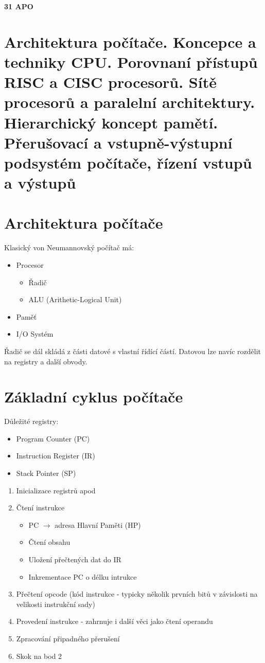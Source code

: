 \documentclass[10pt,a4paper,openright]{article}
\begin{document}
\begin{center}
\begin{LARGE}
\textbf{31 APO}\\
\end{LARGE}
\end{center}

\section*{Architektura počítače. Koncepce a techniky CPU. Porovnaní přístupů RISC a CISC procesorů. Sítě procesorů a paralelní architektury. Hierarchický koncept pamětí. Přerušovací a vstupně-výstupní podsystém počítače, řízení vstupů a výstupů}
\section{Architektura počítače}
Klasický von Neumannovský počítač má:
\begin{itemize}
\item Procesor
	\begin{itemize}
	\item Řadič
	\item ALU (Arithetic-Logical Unit)
	\end{itemize}
\item Paměť
\item I/O Systém
\end{itemize}
Řadič se dál skládá z části datové s vlastní řídící částí. Datovou lze navíc rozdělit na registry a další obvody.

\section{Základní cyklus počítače}

Důležité registry:
\begin{itemize}
\item Program Counter (PC)
\item Instruction Register (IR)
\item Stack Pointer (SP)
\end{itemize}

\begin{enumerate}
\item Inicializace registrů apod
\item Čtení instrukce
	\begin{itemize}
	\item PC $\rightarrow$ adresa Hlavní Paměti (HP)
	\item Čtení obsahu
	\item Uložení přečtených dat do IR
	\item Inkrementace PC o délku intrukce
	\end{itemize}
\item Přečtení opcode (kód instrukce - typicky několik prvních bitů v závislosti na velikosti instrukční sady)
\item Provedení instrukce - zahrnuje i další věci jako čtení operandu
\item Zpracování připadného přerušení
\item Skok na bod 2
\end{enumerate}
\end{document}
